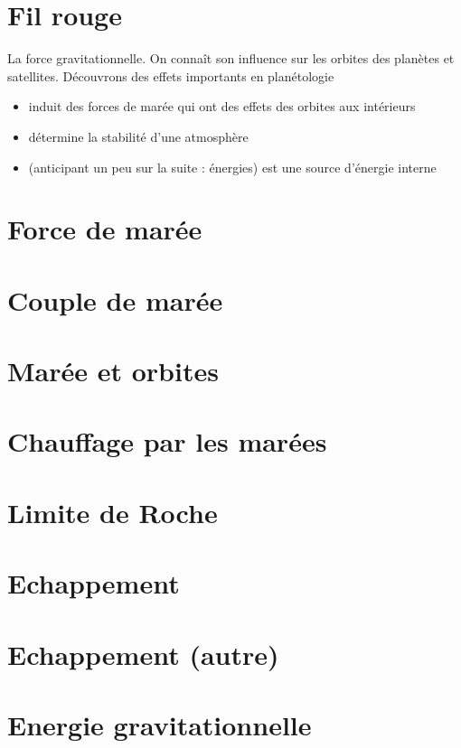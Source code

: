 \documentclass[a4paper,DIV16,10pt]{scrartcl}
\begin{document}
 \inidoc

\newpage
\section{Fil rouge}

La force gravitationnelle. 
On connaît son influence sur les orbites des planètes et satellites.
Découvrons des effets importants en planétologie
\begin{itemize}
\item induit des forces de marée qui ont des effets des orbites aux intérieurs
\item détermine la stabilité d'une atmosphère
\item (anticipant un peu sur la suite : énergies) est une source d'énergie interne
\end{itemize}


\newpage
\section{Force de marée}


\newpage
\section{Couple de marée}


\newpage
\section{Marée et orbites}


\newpage
\section{Chauffage par les marées}


\newpage
\section{Limite de Roche}


\newpage
\section{Echappement}


\newpage
\section{Echappement (autre)}


\newpage
\section{Energie gravitationnelle}

\end{document}
